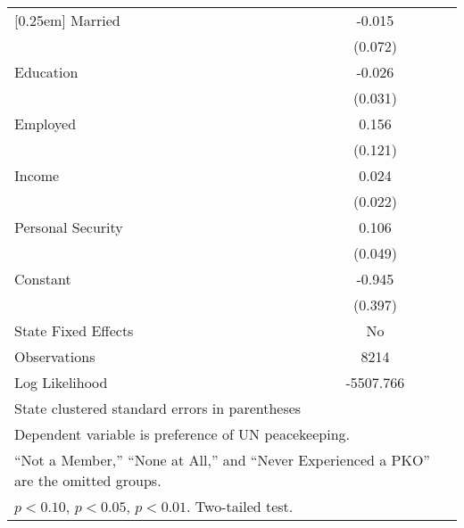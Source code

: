 \begin{table}[htbp]
\begin{tabular}{l*{1}{c}}
[0.25em]
Married             &      -0.015        \\
                    &     (0.072)        \\
[0.25em]
Education           &      -0.026        \\
                    &     (0.031)        \\
[0.25em]
Employed            &       0.156        \\
                    &     (0.121)        \\
[0.25em]
Income              &       0.024        \\
                    &     (0.022)        \\
[0.25em]
Personal Security   &       0.106\sym{*} \\
                    &     (0.049)        \\
[0.25em]
Constant            &      -0.945\sym{*} \\
                    &     (0.397)        \\
\hline
State Fixed Effects &          No        \\
Observations        &    8214      \\
Log Likelihood      &    -5507.766        \\
\hline\hline
\multicolumn{2}{l}{\fontsize{6}{6}\selectfont State clustered standard errors in parentheses}\\
\multicolumn{2}{l}{\fontsize{6}{6}\selectfont Dependent variable is preference of UN peacekeeping.}\\
\multicolumn{2}{l}{\fontsize{6}{6}\selectfont ``Not a Member,'' ``None at All,'' and ``Never Experienced a PKO'' are the omitted groups.}\\
\multicolumn{2}{l}{\fontsize{6}{6}\selectfont \sym{+} \(p<0.10\), \sym{*} \(p<0.05\), \sym{**} \(p<0.01\). Two-tailed test.}\\
\end{tabular}
\end{table}

